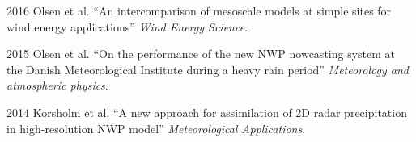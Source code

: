 \documentclass[12pt,letterpaper]{report}
\begin{document}
\begin{tablist}

\item[2016] \tab Olsen et al. \enquote{An intercomparison of mesoscale models at simple sites for wind energy applications} \textit{Wind Energy Science}.

\item[2015] \tab Olsen et al. \enquote{On the performance of the new NWP nowcasting system at the Danish Meteorological Institute during a heavy rain period} \textit{Meteorology and atmospheric physics}.

\item[2014] \tab Korsholm et al. \enquote{A new approach for assimilation of 2D radar precipitation in high-resolution NWP model} \textit{Meteorological Applications}.


\end{tablist}









\end{document}
